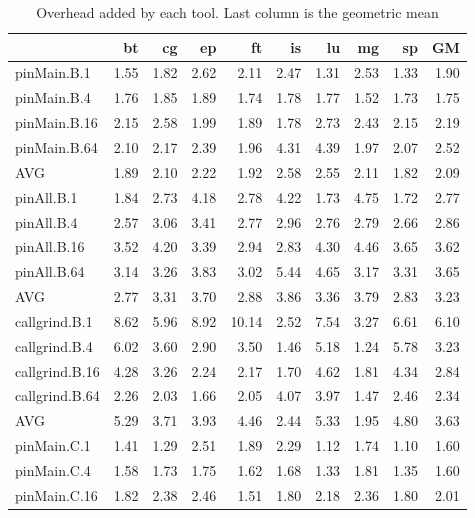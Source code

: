 \iffalse
\begin{table}[]
\caption{Overhead added by each tool. Last column is the geometric mean}
\label{comet_sd_pMpAcg_BC_itn_p3.5}\begin{center}
\begin{tabular}{lrrrrrrrrr}
\hline
                &   bt &   cg &    ep &    ft &   is &   lu &   mg &   sp &   GM \\
\hline
 pinMain.B.1    & 1.55 & 1.82 &  2.62 &  2.11 & 2.47 & 1.31 & 2.53 & 1.33 & 1.90 \\
 pinMain.B.4    & 1.76 & 1.85 &  1.89 &  1.74 & 1.78 & 1.77 & 1.52 & 1.73 & 1.75 \\
 pinMain.B.16   & 2.15 & 2.58 &  1.99 &  1.89 & 1.78 & 2.73 & 2.43 & 2.15 & 2.19 \\
 pinMain.B.64   & 2.10 & 2.17 &  2.39 &  1.96 & 4.31 & 4.39 & 1.97 & 2.07 & 2.52 \\
 AVG            & 1.89 & 2.10 &  2.22 &  1.92 & 2.58 & 2.55 & 2.11 & 1.82 & 2.09 \\
 pinAll.B.1     & 1.84 & 2.73 &  4.18 &  2.78 & 4.22 & 1.73 & 4.75 & 1.72 & 2.77 \\
 pinAll.B.4     & 2.57 & 3.06 &  3.41 &  2.77 & 2.96 & 2.76 & 2.79 & 2.66 & 2.86 \\
 pinAll.B.16    & 3.52 & 4.20 &  3.39 &  2.94 & 2.83 & 4.30 & 4.46 & 3.65 & 3.62 \\
 pinAll.B.64    & 3.14 & 3.26 &  3.83 &  3.02 & 5.44 & 4.65 & 3.17 & 3.31 & 3.65 \\
 AVG            & 2.77 & 3.31 &  3.70 &  2.88 & 3.86 & 3.36 & 3.79 & 2.83 & 3.23 \\
 callgrind.B.1  & 8.62 & 5.96 &  8.92 & 10.14 & 2.52 & 7.54 & 3.27 & 6.61 & 6.10 \\
 callgrind.B.4  & 6.02 & 3.60 &  2.90 &  3.50 & 1.46 & 5.18 & 1.24 & 5.78 & 3.23 \\
 callgrind.B.16 & 4.28 & 3.26 &  2.24 &  2.17 & 1.70 & 4.62 & 1.81 & 4.34 & 2.84 \\
 callgrind.B.64 & 2.26 & 2.03 &  1.66 &  2.05 & 4.07 & 3.97 & 1.47 & 2.46 & 2.34 \\
 AVG            & 5.29 & 3.71 &  3.93 &  4.46 & 2.44 & 5.33 & 1.95 & 4.80 & 3.63 \\
 pinMain.C.1    & 1.41 & 1.29 &  2.51 &  1.89 & 2.29 & 1.12 & 1.74 & 1.10 & 1.60 \\
 pinMain.C.4    & 1.58 & 1.73 &  1.75 &  1.62 & 1.68 & 1.33 & 1.81 & 1.35 & 1.60 \\
 pinMain.C.16   & 1.82 & 2.38 &  2.46 &  1.51 & 1.80 & 2.18 & 2.36 & 1.80 & 2.01 \\

\end{tabular}
\end{center}
\end{table}
